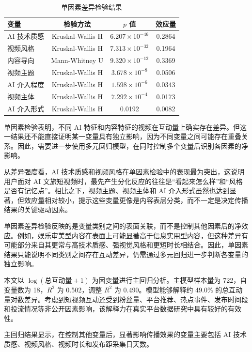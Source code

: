 \begin{table}[htbp]
  \centering
  \caption{单因素差异检验结果}
  \label{tab:univariate}
  \begin{tabular}{lccc}
    \toprule
    变量 & 检验方法 & $p$ 值 & 效应量 \\
    \midrule
    AI 技术质感 & Kruskal-Wallis H & $6.207\times 10^{-46}$ & 0.2864 \\
    视频风格 & Kruskal-Wallis H & $7.313\times 10^{-32}$ & 0.1964 \\
    内容导向 & Mann-Whitney U & $9.320\times 10^{-12}$ & 0.3369 \\
    视频主题 & Kruskal-Wallis H & $3.678\times 10^{-8}$ & 0.0506 \\
    AI 介入程度 & Kruskal-Wallis H & $1.598\times 10^{-6}$ & 0.0343 \\
    视频主体 & Kruskal-Wallis H & $7.292\times 10^{-4}$ & 0.0173 \\
    AI 介入形式 & Kruskal-Wallis H & 0.0192 & 0.0082 \\
    \bottomrule
  \end{tabular}
\end{table}

单因素检验表明，不同 AI 特征和内容特征的视频在互动量上确实存在差异。但这一结果还不能直接证明某一变量具有独立影响，因为不同变量之间可能存在重叠关系。因此，需要进一步使用多元回归模型，在同时控制多个变量后识别各因素的净影响。

从差异强度看，AI 技术质感和视频风格在单因素检验中的表现最为突出，这说明用户面对 AI 文旅短视频时，最先产生分化反应的往往是“看起来怎么样”和“风格是否有记忆点”。相比之下，视频主题、视频主体和 AI 介入形式虽然也达到显著，但效应量相对较小，提示这些变量更像是内容表层分类，而不一定是决定传播结果的关键驱动因素。

单因素差异检验反映的是变量类别之间的表面关联，而不是控制其他因素后的净效应。例如，娱乐审美型内容在表面上可能显著高于信息实用型内容，但这种差异有可能部分来自其更常与高技术质感、强视觉风格和更短时长相结合。因此，单因素结果只能说明不同类别之间存在互动差异，仍需通过多元回归进一步判断各变量的独立影响。

本文以 $\log(\text{总互动量}+1)$ 为因变量进行主回归分析。主模型样本量为 722，自变量数为 18，$R^2$ 为 0.502，调整 $R^2$ 为 0.490。模型能够解释约 49.0\% 的总互动量对数差异。考虑到短视频互动还受到粉丝量、平台推荐、热点事件、发布时间段和投流情况等非公开因素影响，该解释力在真实平台数据研究中具有较好的有效性。

主回归结果显示，在控制其他变量后，显著影响传播效果的变量主要包括 AI 技术质感、视频风格、视频时长和发布距采集日天数。

